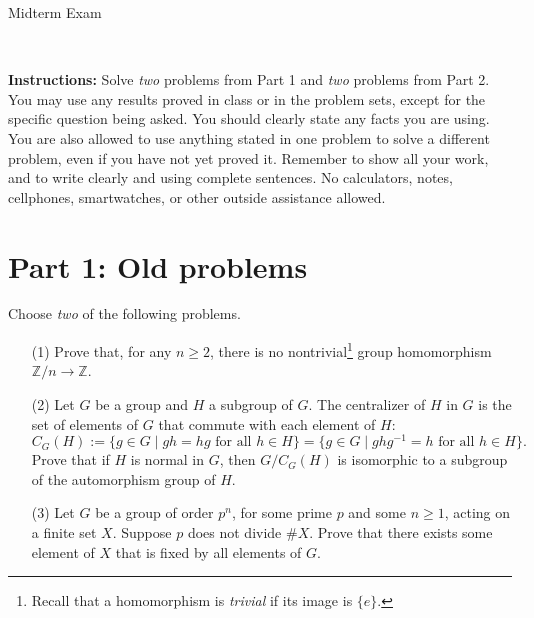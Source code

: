 \documentclass[11pt]{article}
\title{}
\date{\vspace{-0.5in}}
\newcommand{\Z}{\mathbb{Z}}
\theoremstyle{definition}
\begin{document}
\thispagestyle{fancy}
\pagestyle{fancy}

\vspace{3em}

\begin{center}
	{\LARGE Midterm Exam}
\end{center}

\

\noindent
{\bf Instructions:}
Solve \emph{two} problems from Part 1 and \emph{two} problems from Part 2. You may use any results proved in class or in the problem sets, except for the specific question being asked. You should clearly state any facts you are using. You are also allowed to use anything stated in
one problem to solve a different problem, even if you have not yet proved it. Remember to show
all your work, and to write clearly and using complete sentences. No calculators, notes, cellphones,
smartwatches, or other outside assistance allowed.

\section*{Part 1: Old problems}

Choose \emph{two} of the following problems.

\begin{enumerate}
 
 \item[(1)] Prove that, for any $n\geq 2$, there is no nontrivial\footnote{Recall that a homomorphism is \emph{trivial} if its image is $\{e\}$.} group homomorphism $\Z/n \to \Z$.
 
 
           
            
 \item[(2)] Let $G$ be a group and $H$ a subgroup of $G$. The centralizer of $H$ in $G$ is the set of elements of $G$ that commute with each element of $H$:
  $$
  C_G(H) := \{g \in G \mid gh = hg \text{ for all $h \in H$} \} = \{g \in G \mid ghg^{-1} = h \text{ for all $h \in H$} \}.
  $$
  Prove that if $H$ is normal in $G$, then $G/C_G(H)$ is isomorphic to a subgroup of the automorphism group of $H$.
 
   \item[(3)] Let $G$ be a group of order $p^n$, for some prime $p$ and some $n\geq 1$, acting on a finite set $X$.
 Suppose $p$ does not divide $\# X$. Prove that there exists some element of $X$ that is fixed by all elements of $G$.
 
 


     
    


 \end{enumerate}
\end{document}
